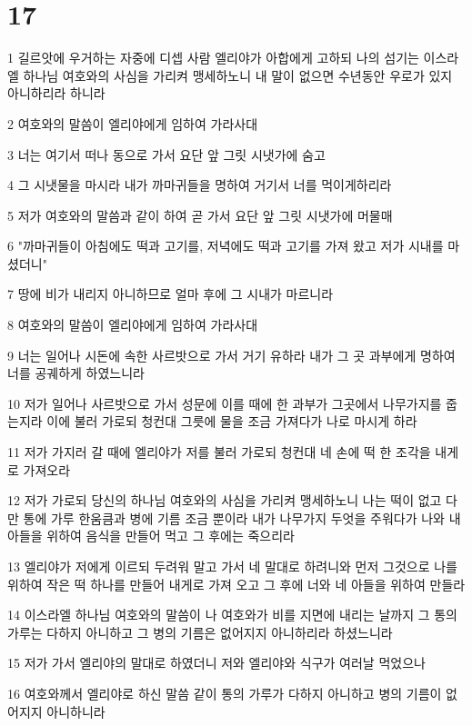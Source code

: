 \chapter{17}

\par 1 길르앗에 우거하는 자중에 디셉 사람 엘리야가 아합에게 고하되 나의 섬기는 이스라엘 하나님 여호와의 사심을 가리켜 맹세하노니 내 말이 없으면 수년동안 우로가 있지 아니하리라 하니라
\par 2 여호와의 말씀이 엘리야에게 임하여 가라사대
\par 3 너는 여기서 떠나 동으로 가서 요단 앞 그릿 시냇가에 숨고
\par 4 그 시냇물을 마시라 내가 까마귀들을 명하여 거기서 너를 먹이게하리라
\par 5 저가 여호와의 말씀과 같이 하여 곧 가서 요단 앞 그릿 시냇가에 머물매
\par 6 "까마귀들이 아침에도 떡과 고기를, 저녁에도 떡과 고기를 가져 왔고 저가 시내를 마셨더니"
\par 7 땅에 비가 내리지 아니하므로 얼마 후에 그 시내가 마르니라
\par 8 여호와의 말씀이 엘리야에게 임하여 가라사대
\par 9 너는 일어나 시돈에 속한 사르밧으로 가서 거기 유하라 내가 그 곳 과부에게 명하여 너를 공궤하게 하였느니라
\par 10 저가 일어나 사르밧으로 가서 성문에 이를 때에 한 과부가 그곳에서 나무가지를 줍는지라 이에 불러 가로되 청컨대 그릇에 물을 조금 가져다가 나로 마시게 하라
\par 11 저가 가지러 갈 때에 엘리야가 저를 불러 가로되 청컨대 네 손에 떡 한 조각을 내게로 가져오라
\par 12 저가 가로되 당신의 하나님 여호와의 사심을 가리켜 맹세하노니 나는 떡이 없고 다만 통에 가루 한움큼과 병에 기름 조금 뿐이라 내가 나무가지 두엇을 주워다가 나와 내 아들을 위하여 음식을 만들어 먹고 그 후에는 죽으리라
\par 13 엘리야가 저에게 이르되 두려워 말고 가서 네 말대로 하려니와 먼저 그것으로 나를 위하여 작은 떡 하나를 만들어 내게로 가져 오고 그 후에 너와 네 아들을 위하여 만들라
\par 14 이스라엘 하나님 여호와의 말씀이 나 여호와가 비를 지면에 내리는 날까지 그 통의 가루는 다하지 아니하고 그 병의 기름은 없어지지 아니하리라 하셨느니라
\par 15 저가 가서 엘리야의 말대로 하였더니 저와 엘리야와 식구가 여러날 먹었으나
\par 16 여호와께서 엘리야로 하신 말씀 같이 통의 가루가 다하지 아니하고 병의 기름이 없어지지 아니하니라
